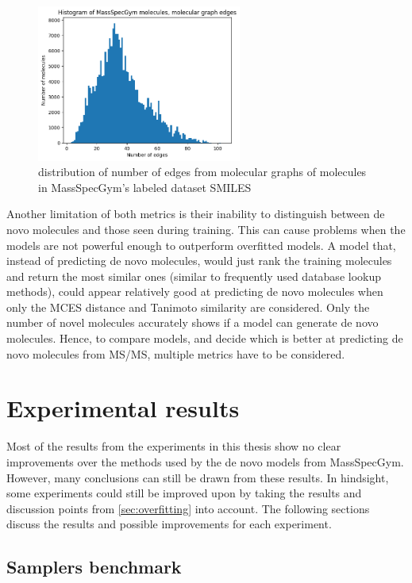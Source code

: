 \begin{figure}[H]
    \centering
    \includegraphics[width=0.6\textwidth]{figures/discussion/number_of_edges_massspecgym.png}
    \caption{distribution of number of edges from molecular graphs of molecules in MassSpecGym's labeled dataset SMILES}
    \label{fig:edges}
\end{figure}


Another limitation of both metrics is their inability to distinguish between de novo molecules and those seen during training.
This can cause problems when the models are not powerful enough to outperform overfitted models.
A model that, instead of predicting de novo molecules, would just rank the training molecules and return the most similar ones (similar to frequently used database lookup methods), could appear relatively good at predicting de novo molecules when only the \ac{MCES} distance and Tanimoto similarity are considered.
Only the number of novel molecules accurately shows if a model can generate de novo molecules.
Hence, to compare models, and decide which is better at predicting de novo molecules from \ac{MS/MS}, multiple metrics have to be considered.

\section{Experimental results}

Most of the results from the experiments in this thesis show no clear improvements over the methods used by the de novo models from MassSpecGym.
However, many conclusions can still be drawn from these results.
In hindsight, some experiments could still be improved upon by taking the results and discussion points from \ref{sec:overfitting} into account.
The following sections discuss the results and possible improvements for each experiment.

\subsection{Samplers benchmark}


